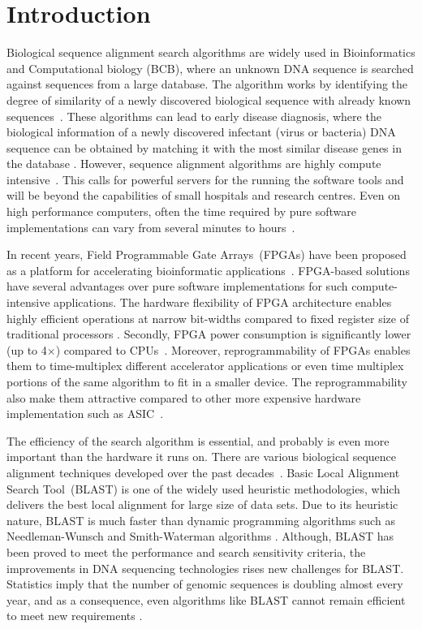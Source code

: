 \section{Introduction}
\label{sec:introduction}

Biological sequence alignment search algorithms are widely used in Bioinformatics and Computational biology (BCB), where an unknown DNA sequence is searched against sequences from a large database. 
The algorithm works by identifying the degree of similarity of a newly discovered biological sequence with already known sequences~\cite{kasap2008design}.
These algorithms can lead to early disease diagnosis, where the biological information of a newly discovered infectant (virus or bacteria) DNA sequence can be obtained by matching it with the most similar disease genes in the database \cite{guo2012systolic}. 
However, sequence alignment algorithms are highly compute intensive~\cite{datta2009}. 
This calls for powerful servers for the running the software tools and will be beyond the capabilities of small hospitals and research centres.
Even on high performance computers, often the time required by pure software implementations can vary from several minutes to hours~\cite{masato2016}.  

In recent years, Field Programmable Gate Arrays~(FPGAs) have been proposed as a platform for accelerating bioinformatic applications~\cite{kasap2008design}. 
FPGA-based solutions have several advantages over pure software implementations for such compute-intensive applications.
The hardware flexibility of FPGA architecture enables highly efficient operations at narrow bit-widths compared to fixed register size of traditional processors \cite{cug2007}. 
Secondly, FPGA power consumption is significantly lower (up to 4$\times$) compared to CPUs~\cite{cug2007}. 
Moreover, reprogrammability of FPGAs enables them to time-multiplex different accelerator applications or even time multiplex portions of the same algorithm to fit in a smaller device. 
The reprogrammability also make them attractive compared to other more expensive hardware implementation such as ASIC~\cite{cug2007}. 

The efficiency of the search algorithm is essential, and probably is even more important than the hardware it runs on. 
There are various biological sequence alignment techniques developed over the past decades~\cite{mohd2013}. 
Basic Local Alignment Search Tool~(BLAST) is one of the widely used heuristic methodologies, which delivers the best local alignment for large size of data sets. 
Due to its heuristic nature, BLAST is much faster than dynamic programming algorithms such as Needleman-Wunsch and Smith-Waterman algorithms \cite{wien2011blastp}. 
Although, BLAST has been proved to meet the performance and search sensitivity criteria, the improvements in DNA sequencing technologies rises new challenges for BLAST. 
Statistics imply that the number of genomic sequences is doubling almost every year, and as a consequence, even algorithms like BLAST cannot remain efficient to meet new requirements \cite{wien2011blastp}. 

